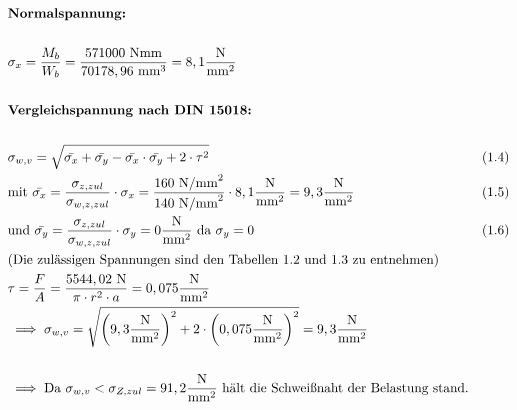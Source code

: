 \begin{itemize}
\begin{align*}
	&\textbf{Normalspannung: } \\ \\
	&\sigma_x = \frac{M_b}{W_b} = \frac{ 571000 \text{ Nmm} }{70178,96 \text{ mm}^3} = 8,1 \frac{\text{N}}{\text{mm}^2}\\ \\
	&\textbf{Vergleichspannung nach DIN 15018: } \\\\
	&\sigma_{w,v} = \sqrt{ \bar{\sigma_x} + \bar{\sigma_y} -\bar{\sigma_x} \cdot \bar{\sigma_y} + 2 \cdot \tau ^2} & (1.4)\\
	&\text{mit } \bar{\sigma_x} = \frac{\sigma_{z,zul}}{\sigma_{w,z,zul}} \cdot \sigma_x  = \frac{160 \text{ N/mm}^2 }{140 \text{ N/mm}^2} \cdot 8,1 \frac{\text{N}}{\text{mm}^2} = 9,3 \frac{\text{N}}{\text{mm}^2} & (1.5) \\
	&\text{und } \bar{\sigma_y} = \frac{\sigma_{z,zul}}{\sigma_{w,z,zul}} \cdot \sigma_y  = 0 \frac{\text{N}}{\text{mm}^2} \text{ da } \sigma_y  = 0 & (1.6) \\
	&\text{(Die zulässigen Spannungen sind den Tabellen 1.2 und 1.3 zu entnehmen)} \\
	&\tau = \frac{F}{A} = \frac{5544,02 \text{ N}}{\pi \cdot r^2 \cdot a} = 0,075 \frac{\text{N}}{\text{mm}^2}\\
	&\implies \sigma_{w,v} = \sqrt{ \left(  9,3 \frac{\text{N}}{\text{mm}^2} \right)^2 + 2 \cdot \left(  0,075 \frac{\text{N}}{\text{mm}^2} \right)^2 } = 9,3\frac{\text{N}}{\text{mm}^2} \\ \\
	&\implies \text{Da }\sigma_{w,v} < \sigma_{Z,zul } = 91,2 \frac{\text{N}}{\text{mm}^2}  \text{ hält die Schweißnaht der Belastung stand.}
	\end{align*}
\end{itemize}